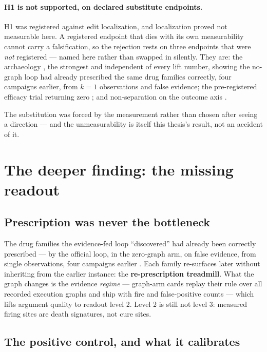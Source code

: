 \paragraph{H1 is not supported, on declared substitute endpoints.} H1 was
registered against edit localization, and localization proved not
measurable here. A registered endpoint that dies with its own measurability
cannot carry a falsification, so the rejection rests on three endpoints
that were \emph{not} registered --- named here rather than swapped in
silently. They are: the archaeology , the strongest and independent
of every lift number, showing the no-graph loop had already prescribed the
same drug families correctly, four campaigns earlier, from $k{=}1$
observations and false evidence; the pre-registered efficacy trial returning
zero ; and non-separation on the outcome axis .

The substitution was forced by the measurement rather than chosen after
seeing a direction --- and the unmeasurability is itself this thesis's
result, not an accident of it.

\section{The deeper finding: the missing readout}
\label{sec:readout}

\subsection*{Prescription was never the bottleneck}

The drug families the evidence-fed loop ``discovered'' had already been
correctly prescribed --- by the official loop, in the zero-graph arm, on
false evidence, from single observations, four campaigns earlier .
Each family re-surfaces later without inheriting from the earlier
instance: the \textbf{re-prescription treadmill}. What the graph changes
is the evidence \emph{regime} --- graph-arm cards replay their rule over
all recorded execution graphs and ship with fire and false-positive
counts --- which lifts argument quality to readout level 2. Level 2 is
still not level 3: measured firing sites are death signatures, not cure
sites.

\subsection*{The positive control, and what it calibrates}

